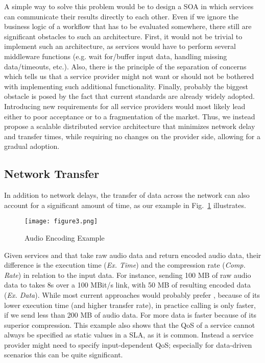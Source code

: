 \documentclass[10pt, conference, compsocconf]{IEEEtran}
\newcommand{\oneImage}{3.2in}
\begin{document}
A simple way to solve this problem would be to design a SOA in which services can communicate their results directly to each other.
Even if we ignore the business logic of a workflow that has to be evaluated somewhere,
	there still are significant obstacles to such an architecture.
First, it would not be trivial to implement such an architecture,
	as services would have to perform several middleware functions (e.g. wait for/buffer input data, handling missing data/timeouts, etc.).
Also, there is the principle of the separation of concerns
	which tells us that a service provider might not want or should not be bothered with implementing such additional functionality.
Finally, probably the biggest obstacle is posed by the fact that current standards are already widely adopted.
Introducing new requirements for all service providers would most likely lead either to poor acceptance or to a fragmentation of the market.
Thus, we instead propose a scalable distributed service architecture that minimizes network delay and transfer times,
	while requiring no changes on the provider side, allowing for a gradual adoption.

\subsection{Network Transfer}
\noindent In addition to network delays,
	the transfer of data across the network can also account for a significant amount of time,
		as our example in Fig.~\ref{fig:exampleTransfer} illustrates.

\begin{figure}[htb!]
	\centering
  \texttt{[image: figure3.png]}
	\caption{Audio Encoding Example}
  \label{fig:exampleTransfer}
\end{figure}

\noindent Given services  and  that take raw audio data
	and return encoded audio data,
		their difference is the execution time (\textit{Ex. Time}) and the compression rate (\textit{Comp. Rate}) in relation to the input data.
For instance, sending 100 MB of raw audio data to  takes 8s over a 100 MBit/s link,
	with 50 MB of resulting encoded data (\textit{Ex. Data}).
While most current approaches would probably prefer , because of its lower execution time (and higher transfer rate),
	in practice calling  is only faster, if we send less than 200 MB of audio data.
For more data  is faster because of its superior compression. 
This example also shows that the QoS of a service cannot always be specified as static values in a SLA,	as it is common.
Instead a service provider might need to specify input-dependent QoS;
	especially for data-driven scenarios this can be quite significant.
\end{document}
